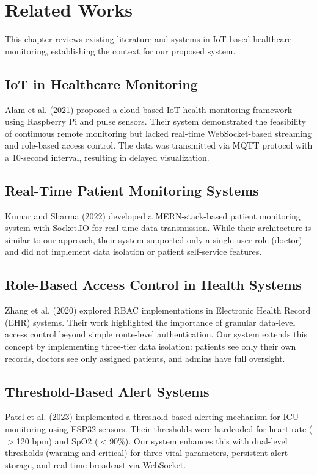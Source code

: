 \chapter{Related Works}

This chapter reviews existing literature and systems in IoT-based healthcare monitoring, establishing the context for our proposed system.

\section{IoT in Healthcare Monitoring}
Alam et al. (2021) proposed a cloud-based IoT health monitoring framework using Raspberry Pi and pulse sensors. Their system demonstrated the feasibility of continuous remote monitoring but lacked real-time WebSocket-based streaming and role-based access control. The data was transmitted via MQTT protocol with a 10-second interval, resulting in delayed visualization.

\section{Real-Time Patient Monitoring Systems}
Kumar and Sharma (2022) developed a MERN-stack-based patient monitoring system with Socket.IO for real-time data transmission. While their architecture is similar to our approach, their system supported only a single user role (doctor) and did not implement data isolation or patient self-service features.

\section{Role-Based Access Control in Health Systems}
Zhang et al. (2020) explored RBAC implementations in Electronic Health Record (EHR) systems. Their work highlighted the importance of granular data-level access control beyond simple route-level authentication. Our system extends this concept by implementing three-tier data isolation: patients see only their own records, doctors see only assigned patients, and admins have full oversight.

\section{Threshold-Based Alert Systems}
Patel et al. (2023) implemented a threshold-based alerting mechanism for ICU monitoring using ESP32 sensors. Their thresholds were hardcoded for heart rate ($>$120 bpm) and SpO2 ($<$90\%). Our system enhances this with dual-level thresholds (warning and critical) for three vital parameters, persistent alert storage, and real-time broadcast via WebSocket.


